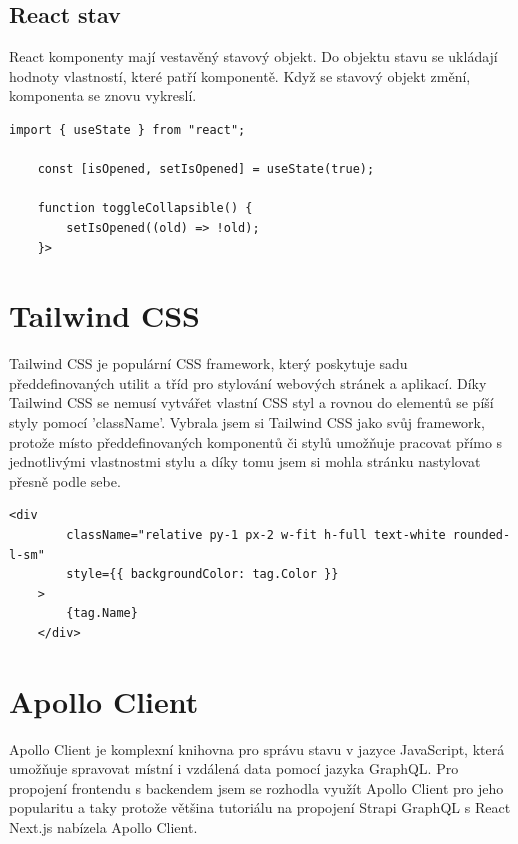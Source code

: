 \documentclass[12pt, a4paper,
oneside,      %
openright
]{report}
\begin{document}
\subsection{React stav}
React komponenty mají vestavěný stavový objekt. Do objektu stavu se ukládají hodnoty vlastností, které patří komponentě. Když se stavový objekt změní, komponenta se znovu vykreslí.

\vspace{10pt}

\begin{lstlisting}[style=JavaScript, title={Kód}, caption={Ukázka useState() v Collapsible.jsx}] 
	import { useState } from "react";
	
	const [isOpened, setIsOpened] = useState(true);
	
	function toggleCollapsible() {
		setIsOpened((old) => !old);
	}>
\end{lstlisting}

\section{Tailwind CSS}
Tailwind CSS je populární CSS framework, který poskytuje sadu předdefinovaných utilit a tříd pro stylování webových stránek a aplikací. Díky Tailwind CSS se nemusí vytvářet vlastní CSS styl a rovnou do elementů se píší styly pomocí 'className'. Vybrala jsem si Tailwind CSS jako svůj framework, protože místo předdefinovaných komponentů či stylů umožňuje pracovat přímo s jednotlivými vlastnostmi stylu a díky tomu jsem si mohla stránku nastylovat přesně podle sebe.

\vspace{10pt}

\begin{lstlisting}[style=JavaScript, title={Kód}, caption={Ukázka useState() v Collapsible.jsx}] 
	<div
		className="relative py-1 px-2 w-fit h-full text-white rounded-l-sm"
		style={{ backgroundColor: tag.Color }}
	>
		{tag.Name}
	</div>
\end{lstlisting}

\newpage
\section{Apollo Client}
Apollo Client je komplexní knihovna pro správu stavu v jazyce JavaScript, která umožňuje spravovat místní i vzdálená data pomocí jazyka GraphQL. Pro propojení frontendu s backendem jsem se rozhodla využít Apollo Client pro jeho popularitu a taky protože většina tutoriálu na propojení Strapi GraphQL s React Next.js nabízela Apollo Client.
\end{document}
